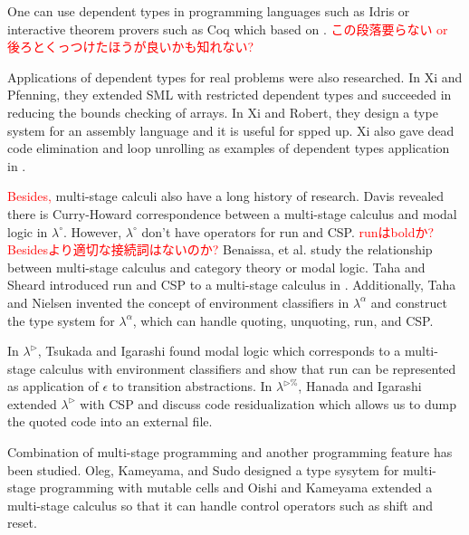 \documentclass[runningheads]{llncs}
\newcommand{\red}[1]{\textcolor{red}{#1 }}
\newcommand{\LTP}{$\lambda^{\triangleright\%}$\xspace}
\newcommand{\TW}{\triangleright}
\begin{document}
One can use dependent types in programming languages such as Idris\cite{brady2013idris} or
interactive theorem provers such as Coq\cite{09thecoq} which based on \cite{coquand:inria-00076024}.
\red{この段落要らない or 後ろとくっつけたほうが良いかも知れない?}


Applications of dependent types for real problems were also researched.
In Xi and Pfenning\cite{Xi98}, they extended SML with restricted dependent types
and succeeded in reducing the bounds checking of arrays.
In Xi and Robert\cite{xi2001dependently}, they design a type system for an assembly language and
it is useful for spped up.
Xi also gave dead code elimination and loop unrolling as examples of dependent types application in \cite{xi1999dependent}.


\red{Besides,} multi-stage calculi also have a long history of research.
Davis revealed there is Curry-Howard correspondence between a multi-stage calculus and modal logic in $\lambda^\circ$\cite{davies1996temporal}.
However, $\lambda^\circ$ don't have operators for run and CSP.
\red{runはboldか? Besidesより適切な接続詞はないのか?}
Benaissa, et al. \cite{benaissa1999logical} study the relationship between multi-stage calculus and category theory or modal logic.
Taha and Sheard introduced run and CSP to a multi-stage calculus in \cite{MetaML}.
Additionally, Taha and Nielsen invented the concept of environment classifiers in $\lambda^\alpha$\cite{taha2003environment} and 
construct the type system for $\lambda^\alpha$, which can handle quoting, unquoting, run, and CSP.

In $\lambda^\TW$\cite{Tsukada}, Tsukada and Igarashi found modal logic which corresponds to a multi-stage calculus with environment classifiers and
show that run can be represented as application of $\epsilon$ to transition abstractions.
In \LTP\cite{Hanada2014}, Hanada and Igarashi extended $\lambda^\TW$ with CSP and discuss code residualization 
which allows us to dump the quoted code into an external file.


Combination of multi-stage programming and another programming feature has been studied.
Oleg, Kameyama, and Sudo\cite{kiselyov2016refined} designed a type sysytem for multi-stage programming with mutable cells and
Oishi and Kameyama\cite{oishi2017staging} extended a multi-stage calculus so that it can handle control operators such as shift and reset.
\end{document}
